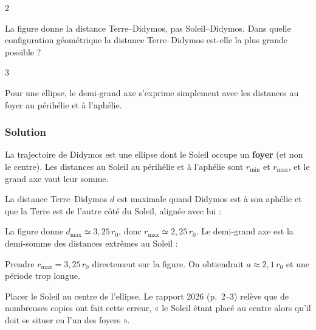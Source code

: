 \documentclass[11pt,a4paper]{article}
\newcommand{\equationajustee}[1]{%
  \sbox{\boiteequation}{$\displaystyle #1$}%
  \ifdim\wd\boiteequation>\linewidth
    \[\resizebox{\linewidth}{!}{\usebox{\boiteequation}}\]%
  \else
    \[#1\]%
  \fi}
\begin{document}
\begin{indication}{2}

La figure donne la distance Terre--Didymos, pas Soleil--Didymos. Dans quelle configuration géométrique la distance Terre--Didymos est-elle la plus grande possible ?

\end{indication}

\begin{indication}{3}

Pour une ellipse, le demi-grand axe s'exprime simplement avec les distances au foyer au périhélie et à l'aphélie.

\end{indication}

\hypertarget{solution-1}{%
\subsubsection{Solution}\label{solution-1}}

La trajectoire de Didymos est une ellipse dont le Soleil occupe un \textbf{foyer} (et non le centre). Les distances au Soleil au périhélie et à l'aphélie sont \(r_{\min}\) et \(r_{\max}\), et le grand axe vaut leur somme.

La distance Terre--Didymos \(d\) est maximale quand Didymos est à son aphélie et que la Terre est de l'autre côté du Soleil, alignée avec lui :

\equationajustee{d_{\max}=r_{\max}+r_0 .}

La figure donne \(d_{\max}\simeq3{,}25\,r_0\), donc \(r_{\max}\simeq2{,}25\,r_0\). Le demi-grand axe est la demi-somme des distances extrêmes au Soleil :

\equationajustee{\boxed{a=\frac{r_{\min}+r_{\max}}{2}\simeq\frac{1{,}01+2{,}25}{2}\,r_0\simeq1{,}6\,r_0}}

\begin{piege}

Prendre \(r_{\max}=3{,}25\,r_0\) directement sur la figure. On obtiendrait \(a\approx2{,}1\,r_0\) et une période trop longue.

\end{piege}

\begin{piege}

Placer le Soleil au centre de l'ellipse. Le rapport 2026 (p.~2--3) relève que de nombreuses copies ont fait cette erreur, « le Soleil étant placé au centre alors qu'il doit se situer en l'un des foyers ».

\end{piege}
\end{document}
